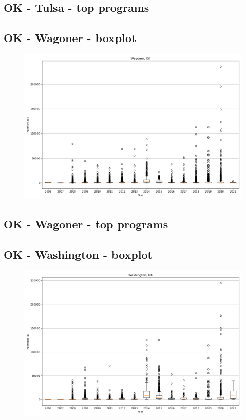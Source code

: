 \subsection*{OK - Tulsa - top programs}

\newpage
\subsection*{OK - Wagoner - boxplot}
\begin{figure}[h]
\centering
\includegraphics[width=7in]{../output/boxplots/counties/Wagoner-OK_boxplot.png}
\end{figure}


\subsection*{OK - Wagoner - top programs}

\newpage
\subsection*{OK - Washington - boxplot}
\begin{figure}[h]
\centering
\includegraphics[width=7in]{../output/boxplots/counties/Washington-OK_boxplot.png}
\end{figure}


